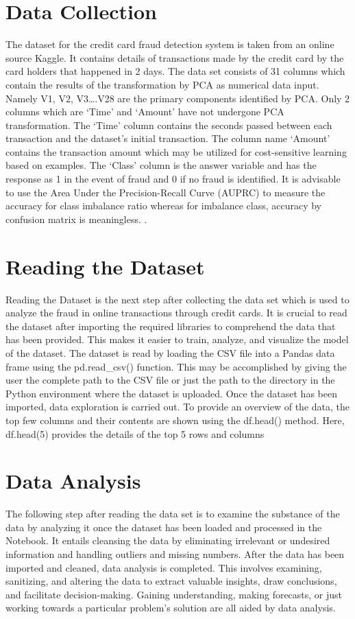 \section{Data Collection}
The dataset for the credit card fraud detection system is taken from an online source Kaggle. It contains details of transactions made by the credit card by the card holders that happened in 2 days. The data set consists of 31 columns which contain the results of the transformation by PCA as numerical data input. Namely V1, V2, V3….V28 are the primary components identified by PCA. Only 2 columns which are ‘Time’ and ‘Amount’ have not undergone PCA transformation. The ‘Time’ column contains the seconds passed between each transaction and the dataset’s initial transaction. The column name ‘Amount’ contains the transaction amount which may be utilized for cost-sensitive learning based on examples. The ‘Class’ column is the answer variable and has the response as 1 in the event of fraud and 0 if no fraud is identified. It is advisable to use the Area Under the Precision-Recall Curve (AUPRC) to measure the accuracy for class imbalance ratio whereas for imbalance class, accuracy by confusion matrix is meaningless.
.
\section{Reading the Dataset}
Reading the Dataset is the next step after collecting the data set which is used to analyze the fraud in online transactions through credit cards. It is crucial to read the dataset after importing the required libraries to comprehend the data that has been provided. This makes it easier to train, analyze, and visualize the model of the dataset. The dataset is read by loading the CSV file into a Pandas data frame using the pd.read\_csv() function. This may be accomplished by giving the user the complete path to the CSV file or just the path to the directory in the Python environment where the dataset is uploaded. Once the dataset has been imported, data exploration is carried out. To provide an overview of the data, the top few columns and their contents are shown using the df.head() method. Here, df.head(5) provides the details of the top 5 rows and columns 



\section{Data Analysis}
The following step after reading the data set is to examine the substance of the data by analyzing it once the dataset has been loaded and processed in the Notebook. It entails cleansing the data by eliminating irrelevant or undesired information and handling outliers and missing numbers. After the data has been imported and cleaned, data analysis is completed. This involves examining, sanitizing, and altering the data to extract valuable insights, draw conclusions, and facilitate decision-making. Gaining understanding, making forecasts, or just working towards a particular problem's solution are all aided by data analysis. 

